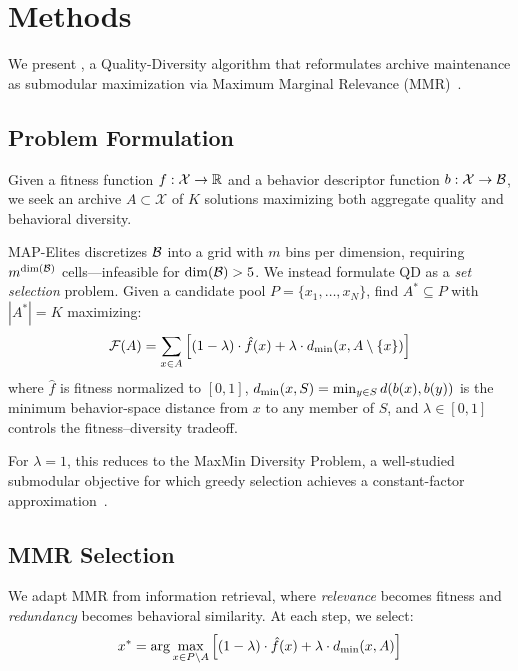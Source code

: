 \section{Methods}
\label{sec:methods}

We present \mmr, a Quality-Diversity algorithm that reformulates archive maintenance as submodular maximization via Maximum Marginal Relevance (MMR)~\cite{carbonell1998use}.

\subsection{Problem Formulation}
\label{sec:formulation}

Given a fitness function $f: \mathcal{X} \to \mathbb{R}$ and a behavior descriptor function $b: \mathcal{X} \to \mathcal{B}$, we seek an archive $A \subset \mathcal{X}$ of $K$ solutions maximizing both aggregate quality and behavioral diversity.

MAP-Elites discretizes $\mathcal{B}$ into a grid with $m$ bins per dimension, requiring $m^{\dim(\mathcal{B})}$ cells---infeasible for $\dim(\mathcal{B}) > 5$.
We instead formulate QD as a \emph{set selection} problem.
Given a candidate pool $P = \{x_1, \ldots, x_N\}$, find $A^* \subseteq P$ with $|A^*| = K$ maximizing:
\begin{equation}
\label{eq:objective}
\mathcal{F}(A) = \sum_{x \in A} \left[ (1 - \lambda) \cdot \hat{f}(x) + \lambda \cdot d_{\min}(x, A \setminus \{x\}) \right]
\end{equation}
where $\hat{f}$ is fitness normalized to $[0, 1]$, $d_{\min}(x, S) = \min_{y \in S} d(b(x), b(y))$ is the minimum behavior-space distance from $x$ to any member of $S$, and $\lambda \in [0, 1]$ controls the fitness--diversity tradeoff.

For $\lambda = 1$, this reduces to the MaxMin Diversity Problem, a well-studied submodular objective for which greedy selection achieves a constant-factor approximation~\cite{nemhauser1978analysis}.

\subsection{MMR Selection}
\label{sec:mmr_selection}

We adapt MMR from information retrieval, where \emph{relevance} becomes fitness and \emph{redundancy} becomes behavioral similarity.
At each step, we select:
\begin{equation}
\label{eq:mmr}
x^* = \arg\max_{x \in P \setminus A} \left[ (1 - \lambda) \cdot \hat{f}(x) + \lambda \cdot d_{\min}(x, A) \right]
\end{equation}

